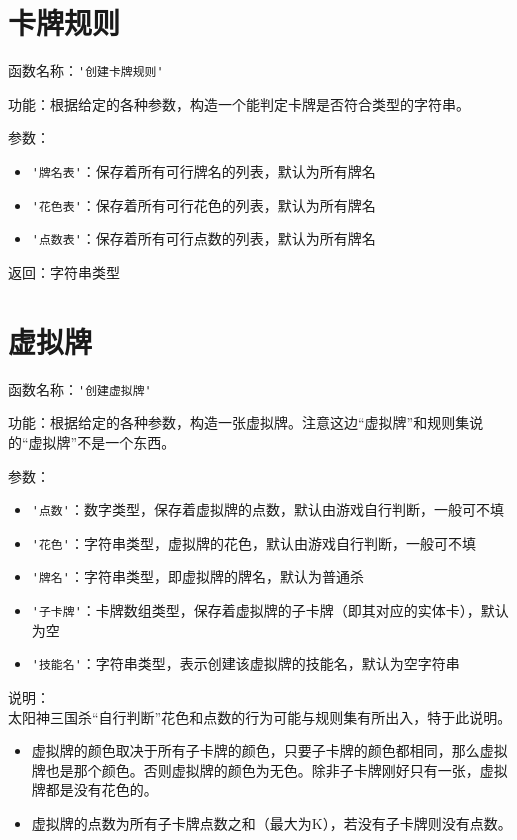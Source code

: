 \section{卡牌规则}

函数名称：\verb|'创建卡牌规则'|

功能：根据给定的各种参数，构造一个能判定卡牌是否符合类型的字符串。

参数：

\begin{itemize}
  \item \verb|'牌名表'|：保存着所有可行牌名的列表，默认为所有牌名
  \item \verb|'花色表'|：保存着所有可行花色的列表，默认为所有牌名
  \item \verb|'点数表'|：保存着所有可行点数的列表，默认为所有牌名
\end{itemize}

返回：字符串类型

\section{虚拟牌}

函数名称：\verb|'创建虚拟牌'|

功能：根据给定的各种参数，构造一张虚拟牌。注意这边“虚拟牌”和规则集说的“虚拟牌”不是一个东西。

参数：

\begin{itemize}
  \item \verb|'点数'|：数字类型，保存着虚拟牌的点数，默认由游戏自行判断，一般可不填
  \item \verb|'花色'|：字符串类型，虚拟牌的花色，默认由游戏自行判断，一般可不填
  \item \verb|'牌名'|：字符串类型，即虚拟牌的牌名，默认为普通杀
  \item \verb|'子卡牌'|：卡牌数组类型，保存着虚拟牌的子卡牌（即其对应的实体卡），默认为空
  \item \verb|'技能名'|：字符串类型，表示创建该虚拟牌的技能名，默认为空字符串
\end{itemize}

说明：\\

太阳神三国杀“自行判断”花色和点数的行为可能与规则集有所出入，特于此说明。

\begin{itemize}
 \item 虚拟牌的颜色取决于所有子卡牌的颜色，只要子卡牌的颜色都相同，那么虚拟牌也是那个颜色。否则虚拟牌的颜色为无色。除非子卡牌刚好只有一张，虚拟牌都是没有花色的。
 \item 虚拟牌的点数为所有子卡牌点数之和（最大为K），若没有子卡牌则没有点数。
\end{itemize}

